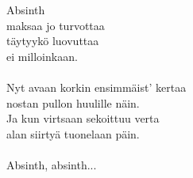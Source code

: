             Absinth \\
            maksaa jo turvottaa \\
            täytyykö luovuttaa \\
            ei milloinkaan. \\
\hspace{10mm} \\
            Nyt avaan korkin ensimmäist' kertaa \\
            nostan pullon huulille näin. \\
            Ja kun virtsaan sekoittuu verta \\
            alan siirtyä tuonelaan päin. \\
\hspace{10mm} \\
            Absinth, absinth... \\
